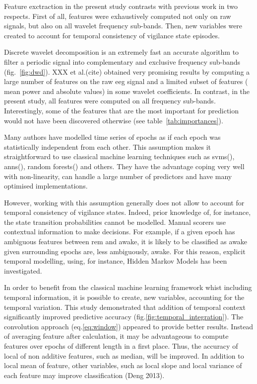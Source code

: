 Feature exctraction in the present study contrasts with previous work in two respects.
First of all, features were exhaustively computed not only on raw signals,
but also on all wavelet frequency sub-bands.
Then, new variables were created to account for temporal consistency of vigilance state episodes.

Discrete wavelet decomposition is an extremely fast an accurate algorithm to filter a periodic
signal into complementary and exclusive frequency sub-bands (fig.~\ref{fig:dwd}).
XXX et al.(cite) \citationneeded{} obtained very promising results by computing a large number of features on the raw \gls{eeg} signal
and a limited subset of features (\ie{} mean power and absolute values) in some wavelet coefficients.
In contrast, in the present study, all features were computed on all frequency sub-bands.
Interestingly, some of the features that are the most important for prediction would not have
been discovered otherwise (see table~\ref{tab:importances}).

Many authors have modelled time series of epochs as if each epoch was statistically independent from each other.
This assumption makes it straightforward to use classical machine learning techniques such as
\glspl{svm}(\citationneeded{}), \glspl{ann}(\citationneeded{}), random forests(\citationneeded{}) and others.
They have the advantage coping very well with non-linearity, can handle a large number of predictors and have many optimised implementations.

However, working with this assumption generally does not allow to account for temporal consistency of vigilance states.
Indeed, prior knowledge of, for instance, the state transition probabilities cannot be modelled.
Manual scorers use contextual information to make decisions.
For example, if a given epoch has ambiguous features between \gls{rem} and awake,
it is likely to be classified as awake given surrounding epochs are, less ambiguously, awake.
For this reason, explicit temporal modelling, using, for instance, Hidden Markov Models has been investigated\citationneeded{}.

In order to benefit from the classical machine learning
framework whist including temporal information,
it is possible to create, new variables, accounting for the temporal variation\citationneeded{}.
This study demonstrated that addition of temporal context significantly improved predictive accuracy (fig.\ref{fig:temporal_integration}).
The convolution approach (eq.\ref{eq:window}) appeared to provide better results.
Instead of averaging feature after calculation, it may be advantageous to compute features over epochs of different length in a first place.
Thus, the accuracy of local of non additive features, such as median, will be improved. In addition to local mean of feature, other variables, such as local
slope and local variance of each feature may improve classification \citationneeded(Deng 2013).

